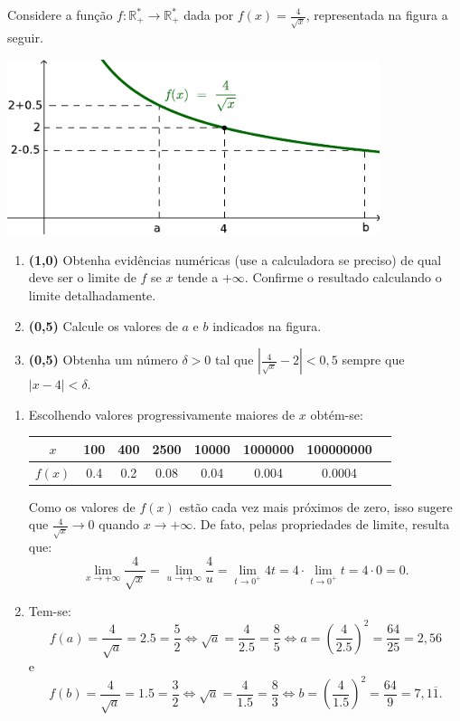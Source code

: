 \documentclass[12pt,a4paper]{article}
\newcommand*\R{\mathbb{R}}
\begin{document}
\begin{ExerciseList}
\Exercise
Considere a função $f: \R_+^* \to \R_+^*$ dada por $f(x) = \frac{4}{\sqrt{x}}$, representada na figura a seguir.
\begin{center}
\includegraphics[width=10.9cm]{img/prova-2-tads-limite-def}
\end{center}
\begin{enumerate}
\item \textbf{(1,0)} Obtenha evidências numéricas (use a calculadora se preciso) de qual deve ser o limite de $f$ se $x$ tende a $+\infty$. Confirme o resultado calculando o limite detalhadamente.
\item \textbf{(0,5)} Calcule os valores de $a$ e $b$ indicados na figura.
\item \textbf{(0,5)} Obtenha um número $\delta > 0$ tal que $\left|\frac{4}{\sqrt{x}} - 2 \right| < 0,5$ sempre que $|x-4| < \delta$.
\end{enumerate}

\Answer
\begin{enumerate}
\item Escolhendo valores progressivamente maiores de $x$ obtém-se:
\begin{center}
\begin{tabular}{|c|c|c|c|c|c|c|c|}
\hline
$x$    & 100 & 400 & 2500 & 10000 & 1000000 & 100000000 \\
\hline
$f(x)$ & 0.4 & 0.2 & 0.08 &  0.04 &   0.004 & 0.0004 \\
\hline
\end{tabular}
\end{center}
Como os valores de $f(x)$ estão cada vez mais próximos de zero, isso sugere que $\frac{4}{\sqrt{x}} \to 0$ quando $x \to +\infty$. De fato, pelas propriedades de limite, resulta que:
\[
\lim_{x \to +\infty} \frac{4}{\sqrt{x}}
= \lim_{u \to +\infty} \frac{4}{u}
= \lim_{t \to 0^+} 4 t
= 4 \cdot \lim_{t \to 0^+} t
= 4 \cdot 0
= 0.
\]
\item Tem-se:
\[
f(a) =
\frac{4}{\sqrt{a}} = 2.5 = \frac{5}{2}
\Leftrightarrow
\sqrt{a} = \frac{4}{2.5} = \frac{8}{5}
\Leftrightarrow
a = \left( \frac{4}{2.5} \right)^2 = \frac{64}{25} = 2,56
\]
e
\[
f(b) =
\frac{4}{\sqrt{a}} = 1.5 = \frac{3}{2}
\Leftrightarrow
\sqrt{a} = \frac{4}{1.5} = \frac{8}{3}
\Leftrightarrow
b = \left( \frac{4}{1.5} \right)^2 = \frac{64}{9} = 7,1\overline{1}.
\]


\end{enumerate}
\end{ExerciseList}
\end{document}
